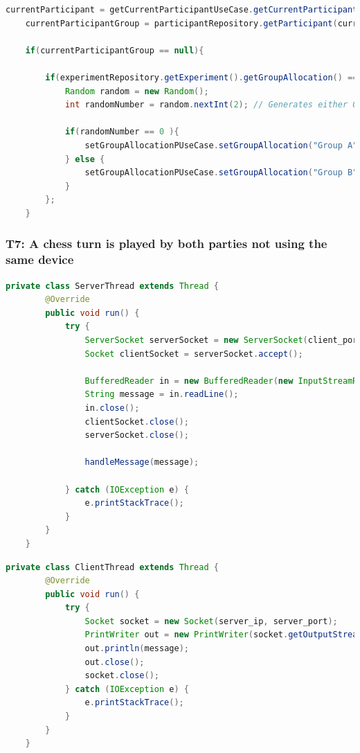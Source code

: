 \begin{lstlisting}[language=java,label=t6,lineskip={0pt}, caption=Collect time needed to conduct experiment (b), basicstyle=\scriptsize, captionpos=b]
    currentParticipant = getCurrentParticipantUseCase.getCurrentParticipant();
    currentParticipantGroup = participantRepository.getParticipant(currentParticipant).getGroupAllocation();
    
    if(currentParticipantGroup == null){
    
        if(experimentRepository.getExperiment().getGroupAllocation() == "random"){
            Random random = new Random();
            int randomNumber = random.nextInt(2); // Generates either 0 or 1
    
            if(randomNumber == 0 ){
                setGroupAllocationPUseCase.setGroupAllocation("Group A", currentParticipant);
            } else {
                setGroupAllocationPUseCase.setGroupAllocation("Group B", currentParticipant);
            }
        };
    }
\end{lstlisting}

\newpage\subsubsection*{T7: A chess turn is played by both parties not using the same device}

\vspace{1cm}

\begin{lstlisting}[language=java,label=t7a,lineskip={0pt}, caption=Collect time needed to conduct experiment (b), basicstyle=\scriptsize, captionpos=b]
private class ServerThread extends Thread {
        @Override
        public void run() {
            try {
                ServerSocket serverSocket = new ServerSocket(client_port);
                Socket clientSocket = serverSocket.accept();

                BufferedReader in = new BufferedReader(new InputStreamReader(clientSocket.getInputStream()));
                String message = in.readLine();
                in.close();
                clientSocket.close();
                serverSocket.close();

                handleMessage(message);

            } catch (IOException e) {
                e.printStackTrace();
            }
        }
    }
\end{lstlisting}


\begin{lstlisting}[language=java,label=t7b,lineskip={0pt}, caption=Collect time needed to conduct experiment (b), basicstyle=\scriptsize, captionpos=b]
    private class ClientThread extends Thread {
        @Override
        public void run() {
            try {
                Socket socket = new Socket(server_ip, server_port);
                PrintWriter out = new PrintWriter(socket.getOutputStream(), true);
                out.println(message);
                out.close();
                socket.close();
            } catch (IOException e) {
                e.printStackTrace();
            }
        }
    }
\end{lstlisting}

